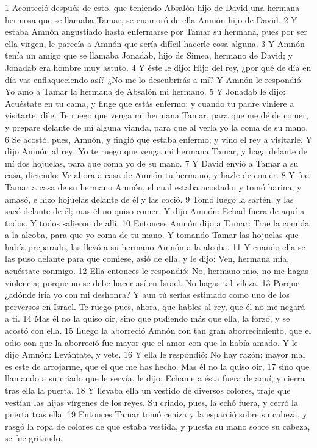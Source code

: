 1 Aconteció después de esto, que teniendo Absalón hijo de David una hermana hermosa que se llamaba Tamar, se enamoró de ella Amnón hijo de David.
2 Y estaba Amnón angustiado hasta enfermarse por Tamar su hermana, pues por ser ella virgen, le parecía a Amnón que sería difícil hacerle cosa alguna.
3 Y Amnón tenía un amigo que se llamaba Jonadab, hijo de Simea, hermano de David; y Jonadab era hombre muy astuto.
4 Y éste le dijo: Hijo del rey, ¿por qué de día en día vas enflaqueciendo así? ¿No me lo descubrirás a mí? Y Amnón le respondió: Yo amo a Tamar la hermana de Absalón mi hermano.
5 Y Jonadab le dijo: Acuéstate en tu cama, y finge que estás enfermo; y cuando tu padre viniere a visitarte, dile: Te ruego que venga mi hermana Tamar, para que me dé de comer, y prepare delante de mí alguna vianda, para que al verla yo la coma de su mano.
6 Se acostó, pues, Amnón, y fingió que estaba enfermo; y vino el rey a visitarle. Y dijo Amnón al rey: Yo te ruego que venga mi hermana Tamar, y haga delante de mí dos hojuelas, para que coma yo de su mano.
7 Y David envió a Tamar a su casa, diciendo: Ve ahora a casa de Amnón tu hermano, y hazle de comer.
8 Y fue Tamar a casa de su hermano Amnón, el cual estaba acostado; y tomó harina, y amasó, e hizo hojuelas delante de él y las coció.
9 Tomó luego la sartén, y las sacó delante de él; mas él no quiso comer. Y dijo Amnón: Echad fuera de aquí a todos. Y todos salieron de allí.
10 Entonces Amnón dijo a Tamar: Trae la comida a la alcoba, para que yo coma de tu mano. Y tomando Tamar las hojuelas que había preparado, las llevó a su hermano Amnón a la alcoba.
11 Y cuando ella se las puso delante para que comiese, asió de ella, y le dijo: Ven, hermana mía, acuéstate conmigo.
12 Ella entonces le respondió: No, hermano mío, no me hagas violencia; porque no se debe hacer así en Israel. No hagas tal vileza.
13 Porque ¿adónde iría yo con mi deshonra? Y aun tú serías estimado como uno de los perversos en Israel. Te ruego pues, ahora, que hables al rey, que él no me negará a ti.
14 Mas él no la quiso oír, sino que pudiendo más que ella, la forzó, y se acostó con ella.
15 Luego la aborreció Amnón con tan gran aborrecimiento, que el odio con que la aborreció fue mayor que el amor con que la había amado. Y le dijo Amnón: Levántate, y vete.
16 Y ella le respondió: No hay razón; mayor mal es este de arrojarme, que el que me has hecho. Mas él no la quiso oír,
17 sino que llamando a su criado que le servía, le dijo: Echame a ésta fuera de aquí, y cierra tras ella la puerta.
18 Y llevaba ella un vestido de diversos colores, traje que vestían las hijas vírgenes de los reyes. Su criado, pues, la echó fuera, y cerró la puerta tras ella.
19 Entonces Tamar tomó ceniza y la esparció sobre su cabeza, y rasgó la ropa de colores de que estaba vestida, y puesta su mano sobre su cabeza, se fue gritando.
